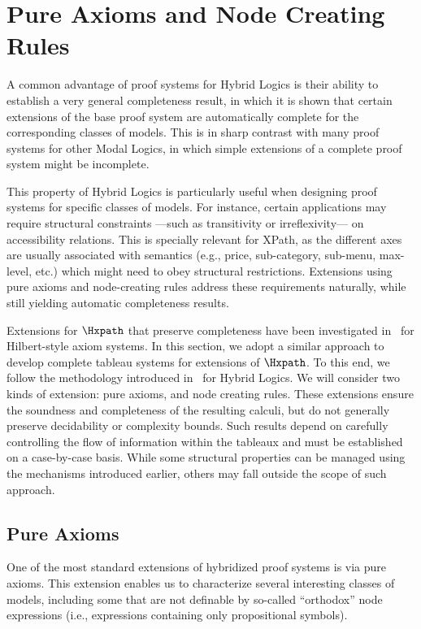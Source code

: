 \section{Pure Axioms and Node Creating Rules}
\label{sec:pure-ext}

A common advantage of proof systems for Hybrid Logics is their ability to establish a very general completeness result, in which it is shown that certain extensions of the base proof system are automatically complete for the corresponding classes of models.  This is in sharp contrast with many proof systems for other Modal Logics, in which simple extensions of a complete proof system might be incomplete.

This property of Hybrid Logics is particularly useful when designing proof systems for specific classes of models. For instance, certain applications may require structural constraints ---such as transitivity or irreflexivity--- on accessibility relations.
This is specially relevant for XPath, as the different axes are usually associated with semantics (e.g., price, sub-category, sub-menu, max-level, etc.) which might need to obey structural restrictions. 
Extensions using pure axioms and node-creating rules address these requirements naturally, while still yielding automatic completeness results.

Extensions for $\Hxpath$ that preserve completeness have been investigated in~\cite{ArecesF21} for Hilbert-style axiom systems. In this section, we adopt a similar approach to develop complete tableau systems for extensions of $\Hxpath$. To this end, we follow the methodology introduced in~\cite{Blackburn00,Blackburn2002BeyondPA,BtC06} for Hybrid Logics. We will consider two kinds of extension: pure axioms, and node creating rules.  These extensions ensure the soundness and completeness of the resulting calculi, but do not generally preserve decidability or complexity bounds. Such results depend on carefully controlling the flow of information within the tableaux and must be established on a case-by-case basis. While some structural properties can be managed using the mechanisms introduced earlier, others may fall outside the scope of such approach.

\subsection{Pure Axioms} 
One of the most standard extensions of hybridized proof systems is via pure axioms. This extension enables us to characterize several interesting classes of models, including some that are not definable by so-called ``orthodox'' node expressions (i.e., expressions containing only propositional symbols). 

